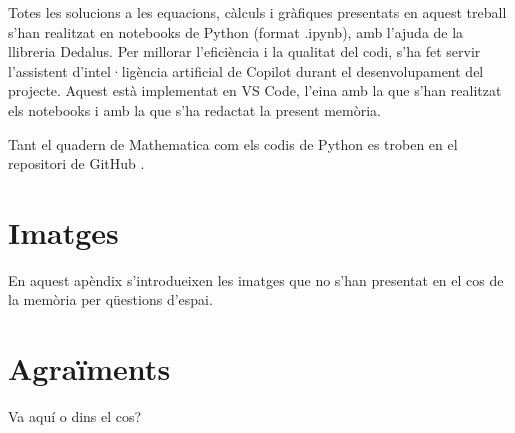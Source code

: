\documentclass[12pt,a4paper]{article}
\numberwithin{equation}{section}
\begin{document}
Totes les solucions a les equacions, càlculs i gràfiques presentats en aquest treball s'han realitzat en notebooks
de Python (format .ipynb), amb l'ajuda de la llibreria Dedalus.
Per millorar l'eficiència i la qualitat del codi, 
s'ha fet servir l'assistent d'intel·ligència artificial de Copilot durant el desenvolupament del projecte.
Aquest està implementat en VS Code, l'eina amb la que s'han realitzat els notebooks i amb la que s'ha redactat la present memòria.

Tant el quadern de Mathematica com els codis de Python es troben en el repositori de GitHub \parencite{github}.

\section{Imatges} \label{ap.B}
En aquest apèndix s'introdueixen les imatges que no s'han presentat en el cos de la memòria per qüestions d'espai.

\section{Agraïments} \label{sec:agr}
Va aquí o dins el cos?



%
%
\end{document}
